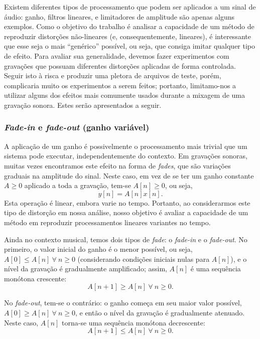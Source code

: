 Existem diferentes tipos de processamento que podem ser aplicados a um sinal de áudio:
ganho, filtros lineares, e limitadores de amplitude são apenas alguns exemplos. Como o
objetivo do trabalho é analisar a capacidade de um método de reproduzir distorções
não-lineares (e, consequentemente, lineares), é interessante que esse seja o mais
``genérico'' possível, ou seja, que consiga imitar qualquer tipo de efeito. Para
avaliar sua generalidade, devemos fazer experimentos com gravações que possuam
diferentes distorções aplicadas de forma controlada. Seguir isto à risca e produzir uma
pletora de arquivos de teste, porém, complicaria muito os experimentos a serem feitos;
portanto, limitamo-nos a utilizar alguns dos efeitos mais comumente usados durante a
mixagem de uma gravação sonora. Estes serão apresentados a seguir.

\subsubsection{\textit{Fade-in} e \textit{fade-out} (ganho variável)}

A aplicação de um ganho é possivelmente o processamento mais trivial que um sistema
pode executar, independentemente do contexto. Em gravações sonoras, muitas vezes
encontramos este efeito na forma de \textit{fades}, que são variações graduais na
amplitude do sinal. Neste caso, em vez de se ter um ganho constante $A \geq
	0$ aplicado a toda a gravação, tem-se $A[n] \geq
	0$, ou seja,
\begin{equation}
	y[n] = A[n] x[n].
\end{equation}
Esta operação é linear, embora varie no tempo. Portanto, ao considerarmos este tipo de distorção em nossa análise, nosso objetivo é avaliar a capacidade de um método em reproduzir processamentos lineares variantes no tempo.

Ainda no contexto musical, temos dois tipos de \textit{fade}: o \textit{fade-in} e o
\textit{fade-out}. No primeiro, o valor inicial do ganho é o menor possível, ou seja,
$A[0] \leq A[n]\ \forall\ n \geq 0$ (considerando condições iniciais nulas para
$A[n]$), e o nível da gravação é gradualmente amplificado; assim, $A[n]$ é uma
sequência monótona crescente:
\begin{equation}
	A[n + 1] \geq A[n]\ \forall\ n \geq 0.
	\label{eq:intro-fade-in}
\end{equation}

No \textit{fade-out}, tem-se o contrário: o ganho começa em seu maior valor possível,
$A[0] \geq A[n]\ \forall\ n \geq 0$, e então o nível da gravação é gradualmente
atenuado. Neste caso, $A[n]$ torna-se uma sequência monótona decrescente:
\begin{equation}
	A[n + 1] \leq A[n]\ \forall\ n \geq 0.
	\label{eq:intro-fade-out}
\end{equation}

